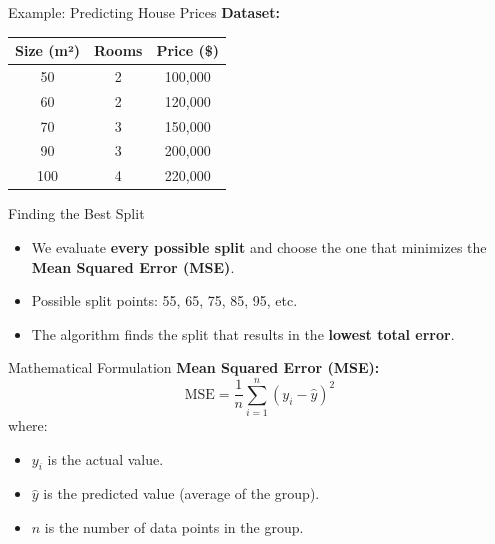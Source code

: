\documentclass[11pt]{beamer}
\begin{document}
\begin{frame}{Example: Predicting House Prices}
    \textbf{Dataset:}
    \begin{table}[]
    \begin{center}
        \begin{tabular}{|c|c|c|}
        \hline
        Size (m²) & Rooms & Price (\$) \\
        \hline
        50 & 2 & 100,000 \\
        60 & 2 & 120,000 \\
        70 & 3 & 150,000 \\
        90 & 3 & 200,000 \\
        100 & 4 & 220,000 \\
        \hline
        \end{tabular}
    \end{center}
	\end{table}
\end{frame}
%
%
\begin{frame}{Finding the Best Split}
    \begin{itemize}
        \item We evaluate \textbf{every possible split} and choose the one that minimizes the \textbf{Mean Squared Error (MSE)}.
        \item Possible split points: 55, 65, 75, 85, 95, etc.
        \item The algorithm finds the split that results in the \textbf{lowest total error}.
    \end{itemize}
\end{frame}
%
%
\begin{frame}{Mathematical Formulation}
    \textbf{Mean Squared Error (MSE):}
    \begin{equation}
        \text{MSE} = \frac{1}{n} \sum_{i=1}^{n} (y_i - \hat{y})^2
    \end{equation}
    where:
    \begin{itemize}
        \item $y_i$ is the actual value.
        \item $\hat{y}$ is the predicted value (average of the group).
        \item $n$ is the number of data points in the group.
    \end{itemize}
\end{frame}
\end{document}
